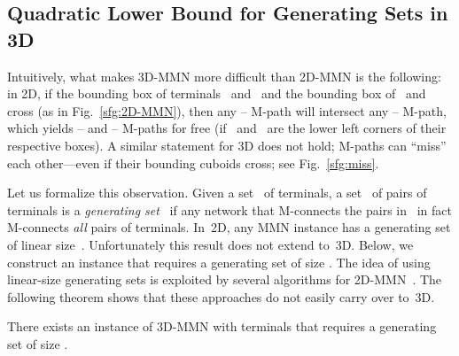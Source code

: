 \documentclass[11pt]{llncs}
\begin{document}
\subsection{Quadratic Lower Bound for Generating Sets in 3D}
\label{sec:generating}

Intuitively, what makes 3D-MMN more difficult than 2D-MMN is the following: 
in 2D, if the bounding box of terminals~ and~ and the
bounding box of~ and~ cross (as in Fig.~\ref{sfg:2D-MMN}), then
any -- M-path will intersect any -- M-path, which yields
-- and -- M-paths for free (if~ and~ are the lower
left corners of their respective boxes).  A similar statement for 3D
does not hold; M-paths can ``miss'' each other---even if their
bounding cuboids cross; see Fig.~\ref{sfg:miss}.

Let us formalize this observation.  Given a set~ of
terminals, a set~ of pairs of terminals is a \emph{generating
  set}~\cite{kia-iammn-02} if any network that M-connects the pairs
in~ in fact M-connects \emph{all} pairs of terminals.
In~2D, any MMN instance has a generating set of linear
size~\cite{kia-iammn-02}.  Unfortunately this
result does not extend to~3D.  Below, we construct an
instance that requires a generating set of size .
The idea of using linear-size generating sets is 
exploited by several algorithms for
2D-MMN~\cite{cnv-raamm-08,kia-iammn-02}. The following theorem shows that these 
approaches do not easily carry over to~3D.


\begin{theorem}
  There exists an instance of 3D-MMN with  terminals that requires
  a generating set of size .
\end{theorem}
\end{document}
